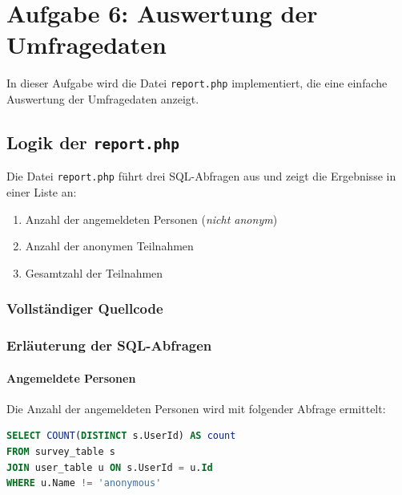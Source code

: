 
\chapter{Aufgabe 6: Auswertung der Umfragedaten}
\label{chap:aufgabe6}
\thispagestyle{fancy}

In dieser Aufgabe wird die Datei \texttt{report.php} implementiert, die eine einfache Auswertung der Umfragedaten anzeigt.

\section{Logik der \texttt{report.php}}

Die Datei \texttt{report.php} führt drei \acs{SQL}-Abfragen aus und zeigt die Ergebnisse in einer Liste an:

\begin{enumerate}
    \item Anzahl der angemeldeten Personen (\textit{nicht anonym})
    \item Anzahl der anonymen Teilnahmen
    \item Gesamtzahl der Teilnahmen
\end{enumerate}

\subsection{Vollständiger Quellcode}



\subsection{Erläuterung der \acs{SQL}-Abfragen}

\subsubsection{Angemeldete Personen}

Die Anzahl der angemeldeten Personen wird mit folgender Abfrage ermittelt:

\begin{lstlisting}[language=sql]
SELECT COUNT(DISTINCT s.UserId) AS count
FROM survey_table s
JOIN user_table u ON s.UserId = u.Id
WHERE u.Name != 'anonymous'
\end{lstlisting}

